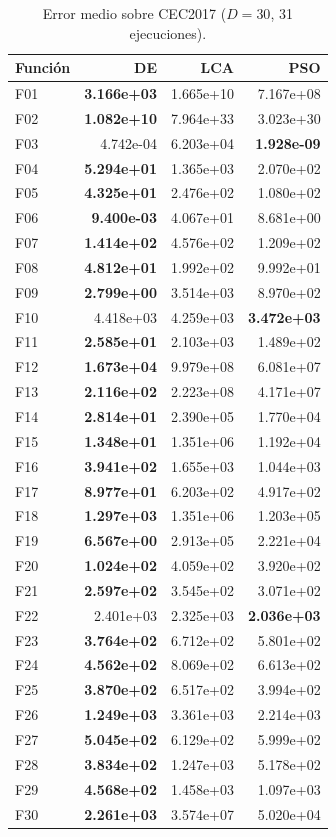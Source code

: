 \begin{table}[h!]
\centering
\caption{Error medio sobre CEC2017 ($D=30$, 31 ejecuciones).}
\label{tab:res_d30}
\footnotesize
\renewcommand{\arraystretch}{1.1}
\begin{tabular}{@{}lrrr@{}}
\toprule
\textbf{Función} & \textbf{DE} & \textbf{LCA} & \textbf{PSO} \\
\midrule
F01 & \textbf{3.166e+03} & 1.665e+10 & 7.167e+08 \\
F02 & \textbf{1.082e+10} & 7.964e+33 & 3.023e+30 \\
F03 & 4.742e-04 & 6.203e+04 & \textbf{1.928e-09} \\
F04 & \textbf{5.294e+01} & 1.365e+03 & 2.070e+02 \\
F05 & \textbf{4.325e+01} & 2.476e+02 & 1.080e+02 \\
F06 & \textbf{9.400e-03} & 4.067e+01 & 8.681e+00 \\
F07 & \textbf{1.414e+02} & 4.576e+02 & 1.209e+02 \\
F08 & \textbf{4.812e+01} & 1.992e+02 & 9.992e+01 \\
F09 & \textbf{2.799e+00} & 3.514e+03 & 8.970e+02 \\
F10 & 4.418e+03 & 4.259e+03 & \textbf{3.472e+03} \\
F11 & \textbf{2.585e+01} & 2.103e+03 & 1.489e+02 \\
F12 & \textbf{1.673e+04} & 9.979e+08 & 6.081e+07 \\
F13 & \textbf{2.116e+02} & 2.223e+08 & 4.171e+07 \\
F14 & \textbf{2.814e+01} & 2.390e+05 & 1.770e+04 \\
F15 & \textbf{1.348e+01} & 1.351e+06 & 1.192e+04 \\
F16 & \textbf{3.941e+02} & 1.655e+03 & 1.044e+03 \\
F17 & \textbf{8.977e+01} & 6.203e+02 & 4.917e+02 \\
F18 & \textbf{1.297e+03} & 1.351e+06 & 1.203e+05 \\
F19 & \textbf{6.567e+00} & 2.913e+05 & 2.221e+04 \\
F20 & \textbf{1.024e+02} & 4.059e+02 & 3.920e+02 \\
F21 & \textbf{2.597e+02} & 3.545e+02 & 3.071e+02 \\
F22 & 2.401e+03 & 2.325e+03 & \textbf{2.036e+03} \\
F23 & \textbf{3.764e+02} & 6.712e+02 & 5.801e+02 \\
F24 & \textbf{4.562e+02} & 8.069e+02 & 6.613e+02 \\
F25 & \textbf{3.870e+02} & 6.517e+02 & 3.994e+02 \\
F26 & \textbf{1.249e+03} & 3.361e+03 & 2.214e+03 \\
F27 & \textbf{5.045e+02} & 6.129e+02 & 5.999e+02 \\
F28 & \textbf{3.834e+02} & 1.247e+03 & 5.178e+02 \\
F29 & \textbf{4.568e+02} & 1.458e+03 & 1.097e+03 \\
F30 & \textbf{2.261e+03} & 3.574e+07 & 5.020e+04 \\
\bottomrule
\end{tabular}
\end{table}

